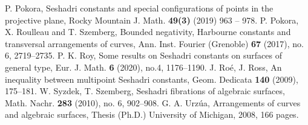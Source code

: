 \documentclass[12pt,reqno]{amsart}
\theoremstyle{plain}
\numberwithin{equation}{section}
\theoremstyle{definition}
\begin{document}
\begin{thebibliography}{100}
		 P. Pokora, Seshadri constants and special configurations of points in the projective plane,
		Rocky Mountain J. Math. \textbf{49(3)} (2019) 963 -- 978.
		 P. Pokora, X. Roulleau and T. Szemberg, Bounded negativity, Harbourne constants and transversal
		arrangements of curves, Ann. Inst. Fourier (Grenoble) \textbf{67} (2017), no. 6, 2719–2735.
		 P. K. Roy,
Some results on Seshadri constants on surfaces of general type,  Eur. J. Math. \textbf{6} (2020), no.4, 1176--1190.
		 J. Ro\'e, J. Ross, 
An inequality between multipoint Seshadri constants, Geom. Dedicata \textbf{140} (2009), 175--181.
		 W. Syzdek, T. Szemberg, Seshadri fibrations of algebraic surfaces, Math. Nachr. \textbf{283} (2010),
no. 6, 902--908.
 G. A. Urz\'ua,  Arrangements of curves and algebraic surfaces,  Thesis (Ph.D.) University of
Michigan, 2008, 166 pages.
	\end{thebibliography}
	
\end{document}

